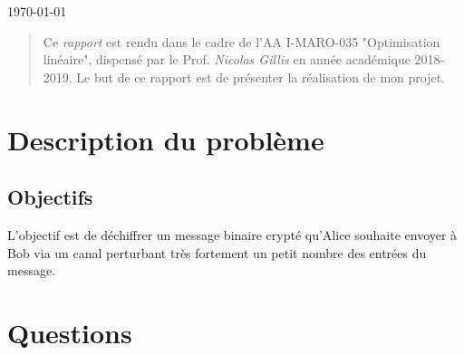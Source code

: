 \documentclass[]{article}
\newcommand{\placeholder}[1]{{\noindent \color{red}[ #1 ]}}
\begin{document}
\bigskip
\begin{center} \today \end{center}
\begin{abstract}
Ce \emph{rapport} est rendu dans le cadre de l'AA \textsf{I-MARO-035} "Optimisation linéaire", dispensé par le Prof. \emph{Nicolas Gillis} en année académique 2018-2019. Le but de ce rapport est de présenter la réalisation de mon projet.
\end{abstract}

\newpage
\section{Description du problème}\label{sec:intro}


\subsection{Objectifs}



L'objectif est de déchiffrer un message binaire crypté qu'Alice souhaite envoyer à Bob via un canal perturbant très fortement un petit nombre des entrées du message. 

\section{Questions}
\end{document}
